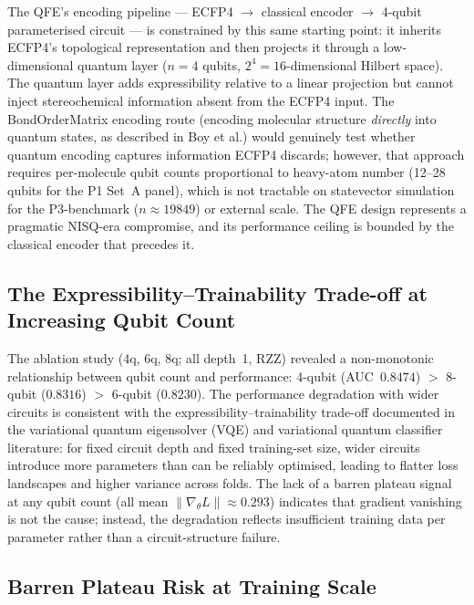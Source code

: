 The QFE's encoding pipeline — ECFP4 $\to$ classical encoder $\to$ 4-qubit
parameterised circuit — is constrained by this same starting point: it
inherits ECFP4's topological representation and then projects it through
a low-dimensional quantum layer ($n = 4$ qubits, $2^4 = 16$-dimensional
Hilbert space). The quantum layer adds expressibility relative to a linear
projection but cannot inject stereochemical information absent from the
ECFP4 input. The BondOrderMatrix encoding route (encoding molecular structure
\emph{directly} into quantum states, as described in Boy et al.\cite{boy2025})
would genuinely test whether quantum encoding captures information ECFP4
discards; however, that approach requires per-molecule qubit counts
proportional to heavy-atom number (12--28 qubits for the P1 Set~A panel),
which is not tractable on statevector simulation for the P3-benchmark
($n \approx 19849$) or external scale. The QFE design represents a
pragmatic NISQ-era compromise, and its performance ceiling is bounded by
the classical encoder that precedes it.

\subsection{The Expressibility--Trainability Trade-off at Increasing Qubit Count}

The ablation study (4q, 6q, 8q; all depth~1, RZZ) revealed a non-monotonic
relationship between qubit count and performance: 4-qubit (AUC~$0.8474$)
$>$ 8-qubit ($0.8316$) $>$ 6-qubit ($0.8230$). The performance degradation
with wider circuits is consistent with the expressibility--trainability
trade-off documented in the variational quantum eigensolver (VQE) and
variational quantum classifier literature\cite{tilly2022variational}: for
fixed circuit depth and fixed training-set size, wider circuits introduce
more parameters than can be reliably optimised, leading to flatter loss
landscapes and higher variance across folds. The lack of a barren
plateau signal at any qubit count (all mean $\|\nabla_\theta L\| \approx 0.293$)
indicates that gradient vanishing is not the cause; instead, the degradation
reflects insufficient training data per parameter rather than a
circuit-structure failure.

\subsection{Barren Plateau Risk at Training Scale}

